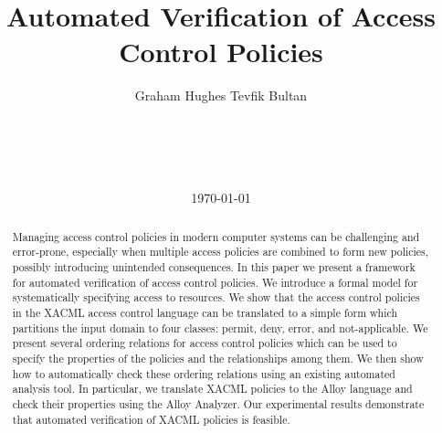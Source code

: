 \documentclass{acm_proc_article-sp}
\begin{document}
\title{Automated Verification of Access Control Policies}
\author{
\alignauthor Graham Hughes \quad Tevfik Bultan \\
       \\
       \\
       \\
       \\
}
\date\today
\maketitle

\begin{abstract}
  Managing access control policies in modern computer systems can be
  challenging and error-prone, especially when multiple access
  policies are combined to form new policies, possibly introducing
  unintended consequences.  In this paper we present a framework for
  automated verification of access control policies.  We introduce a
  formal model for systematically specifying access to resources.  We
  show that the access control policies in the XACML access control
  language can be translated to a simple form which partitions the
  input domain to four classes: permit, deny, error, and
  not-applicable.  We present several ordering relations for access
  control policies which can be used to specify the properties of
  the policies and the relationships among them.  We then show how to
  automatically check these ordering relations using an existing
  automated analysis tool.  In particular, we translate XACML policies
  to the Alloy language and check their properties using the Alloy
  Analyzer.  Our experimental results demonstrate that automated
  verification of XACML policies is feasible.
\end{abstract}








\end{document}
